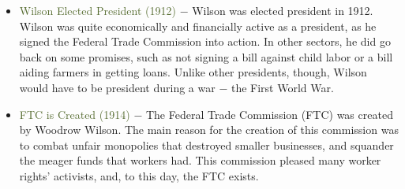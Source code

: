 \documentclass[12pt]{article}
\begin{document}
\begin{itemize}
  \item \textcolor{darkolivegreen}{Wilson Elected President (1912)} $-$ Wilson was elected president in 1912. Wilson was quite economically and financially active as a president, as he signed the Federal Trade Commission into action. In other sectors, he did go back on some promises, such as not signing a bill against child labor or a bill aiding farmers in getting loans. Unlike other presidents, though, Wilson would have to be president during a war $-$ the First World War.

  \item \textcolor{darkolivegreen}{FTC is Created (1914)} $-$ The Federal Trade Commission (FTC) was created by Woodrow Wilson. The main reason for the creation of this commission was to combat unfair monopolies that destroyed smaller businesses, and squander the meager funds that workers had. This commission pleased many worker rights' activists, and, to this day, the FTC exists. 

\end{itemize}
\end{document}
